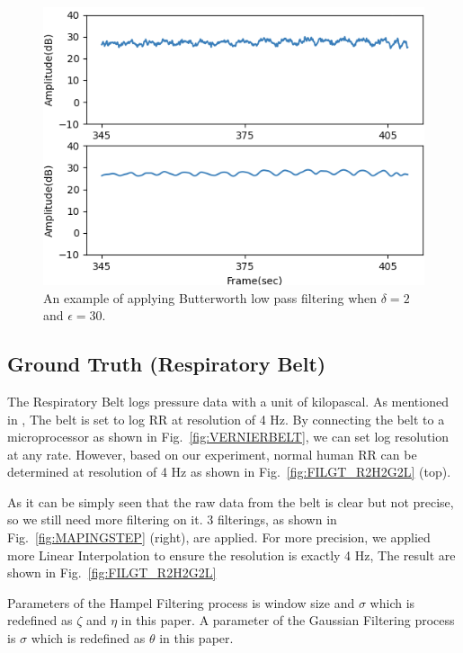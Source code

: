 \documentclass[10pt,letterpaper]{article}
\begin{document}
			\begin{figure}[htbp]
			\centerline{\includegraphics[width=120mm,scale=0.9]{FILPD_L2B.png}}
			\caption{An example of applying Butterworth low pass filtering when $\delta=2$ and $\epsilon=30$.}
			\label{fig:BPL}
				\end{figure}
	\subsection*{Ground Truth (Respiratory Belt)}
		
		The Respiratory Belt logs pressure data with a unit of kilopascal. As mentioned in , The belt is set to log RR at resolution of 4 Hz. By connecting the belt to a microprocessor as shown in Fig.~\ref{fig:VERNIERBELT}, we can set log resolution at any rate. However, based on our experiment, normal human RR can be determined at resolution of 4 Hz as shown in Fig.~\ref{fig:FILGT_R2H2G2L} (top).
		
		As it can be simply seen that the raw data from the belt is clear but not precise, so we still need more filtering on it. 3 filterings, as shown in Fig.~\ref{fig:MAPINGSTEP} (right), are applied. For more precision, we applied more Linear Interpolation to ensure the resolution is exactly 4 Hz, The result are shown in Fig.~\ref{fig:FILGT_R2H2G2L}
		
		Parameters of the Hampel Filtering process is window size and $\sigma$ which is redefined as $\zeta$ and $\eta$ in this paper. A parameter of the Gaussian Filtering process is $\sigma$ which is redefined as $\theta$ in this paper.
		
\end{document}
